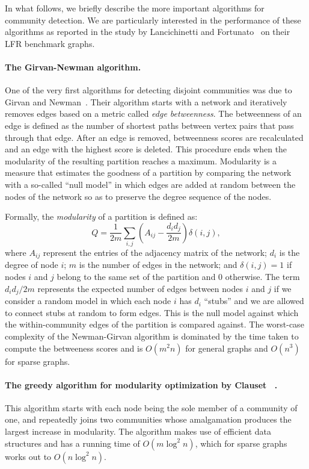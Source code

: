In what follows, we briefly describe the more important algorithms 
for community detection. We are particularly interested in the performance 
of these algorithms as reported in the study by Lancichinetti and 
Fortunato~\cite{LF09} on their LFR benchmark graphs. 

\paragraph{The Girvan-Newman algorithm.} 
One of the very first algorithms for detecting disjoint communities 
was due to Girvan and Newman~\cite{GN02, GN04}. Their 
algorithm starts with a network and iteratively removes edges based 
on a metric called \emph{edge betweenness}. The betweenness of an 
edge is defined as the number of shortest paths between vertex pairs 
that pass through that edge. After an edge is removed, betweenness 
scores are recalculated and an edge with the highest score is deleted. 
This procedure ends when the modularity of the resulting partition
reaches a maximum. Modularity is a measure that estimates the goodness 
of a partition by comparing the network with a so-called ``null model''
in which edges are added at random between the nodes of the network 
so as to preserve the degree sequence of the nodes. 

Formally, the \emph{modularity} of a partition is defined as:
\begin{equation}\label{eqn:modularity}
	Q = \frac{1}{2m} \sum_{i, j} \left ( A_{i j} - \frac{d_i d_j}{2m} \right ) \delta(i, j),
\end{equation}
where $A_{ij}$ represent the entries of the adjacency matrix of the network; $d_i$ is the 
degree of node $i$; $m$ is the number of edges in the network; and $\delta(i, j) = 1$ if nodes
$i$ and $j$ belong to the same set of the partition and $0$ otherwise. The term $d_i d_j / 2m$ 
represents the expected number of edges between nodes $i$ and $j$ if we consider a random model
in which each node $i$ has $d_i$ ``stubs'' and we are allowed to connect stubs at random to form edges. 
This is the null model against which the within-community edges of the partition is compared against.
The worst-case complexity of the Newman-Girvan algorithm is dominated by the time taken 
to compute the betweeness scores and is $O(m^2 n)$ for general graphs and $O(n^3)$ for sparse graphs.

\paragraph{The greedy algorithm for modularity optimization by Clauset \etal~\cite{CNM04}.}
This algorithm starts with each node being the sole member of a community of one, and 
repeatedly joins two communities whose amalgamation produces the largest increase in modularity. 
The algorithm makes use of efficient data structures and has a running time of $O(m \log^2 n)$, 
which for sparse graphs works out to $O(n \log^2 n)$. 


